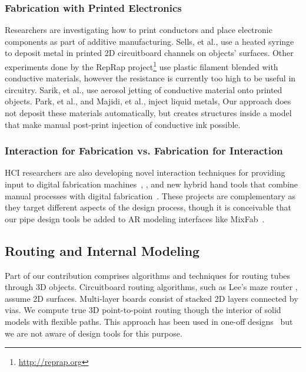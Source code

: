 \subsubsection{Fabrication with Printed Electronics}
Researchers are investigating how to print conductors and place electronic components as part of additive manufacturing.  Sells, et al., \cite{Sells-reprap} use a heated syringe to deposit metal in printed 2D circuitboard channels on objects' surfaces.  Other experiments done by the RepRap project\footnote{\url{http://reprap.org}} use plastic filament blended with conductive materials, however the resistance is currently too high to be useful in circuitry.  Sarik, et al., \cite{Sarik-tracebrush} use aerosol jetting of conductive material onto printed objects.  Park, et al., \cite{Park-microchannels} and Majidi, et al., \cite{Majidi-curvature} inject liquid metals,   Our approach does not deposit these materials automatically, but creates structures inside a model that make manual post-print injection of conductive ink possible.

\subsubsection{Interaction for Fabrication vs. Fabrication for Interaction}
HCI researchers are also developing novel interaction techniques for providing input to digital fabrication machines~\cite{Mueller-constructable,mixfab,Willis-interactive}, , and new hybrid hand tools that combine manual processes with digital fabrication~\cite{rivers2012position,zoran2013freed}. These projects are complementary as they target different aspects of the design process, though it is conceivable that our pipe design tools be added to AR modeling interfaces like MixFab~\cite{mixfab}.

\subsection{Routing and Internal Modeling}
Part of our contribution comprises algorithms and techniques for routing tubes through 3D objects.
Circuitboard routing algorithms, such as Lee's maze router \cite{Lee-maze}, assume 2D surfaces. Multi-layer boards consist of stacked 2D layers connected by vias. We compute true 3D point-to-point routing though the interior of solid models with flexible paths. This approach has been used in one-off designs~\cite{Navarrette-gps} but we are not aware of design tools for this purpose.

